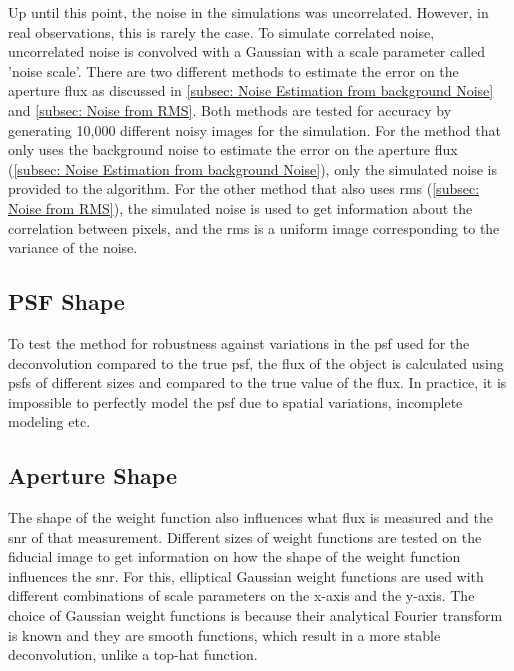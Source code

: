 Up until this point, the noise in the simulations was uncorrelated. However, in real observations, this is rarely the case. To simulate correlated noise, uncorrelated noise is convolved with a Gaussian with a scale parameter called 'noise scale'. There are two different methods to estimate the error on the aperture flux as discussed in \autoref{subsec: Noise Estimation from background Noise} and \autoref{subsec: Noise from RMS}. Both methods are tested for accuracy by generating 10,000 different noisy images for the simulation. For the method that only uses the background noise to estimate the error on the aperture flux (\autoref{subsec: Noise Estimation from background Noise}), only the simulated noise is provided to the algorithm. For the other method that also uses \gls{rms} (\autoref{subsec: Noise from RMS}), the simulated noise is used to get information about the correlation between pixels, and the \gls{rms} is a uniform image corresponding to the variance of the noise.


\subsection{PSF Shape}

To test the method for robustness against variations in the \gls{psf} used for the deconvolution compared to the true \gls{psf}, the flux of the object is calculated using \glspl{psf} of different sizes and compared to the true value of the flux. In practice, it is impossible to perfectly model the \gls{psf} due to spatial variations, incomplete modeling etc. 


\subsection{Aperture Shape}

The shape of the weight function also influences what flux is measured and the \gls{snr} of that measurement. Different sizes of weight functions are tested on the fiducial image to get information on how the shape of the weight function influences the \gls{snr}. For this, elliptical Gaussian weight functions are used with different combinations of scale parameters on the x-axis and the y-axis. The choice of Gaussian weight functions is because their analytical Fourier transform is known and they are smooth functions, which result in a more stable deconvolution, unlike a top-hat function.



